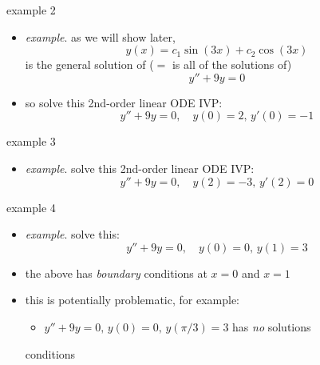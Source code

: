 \documentclass{beamer}
\begin{document}
\begin{frame}{example 2}

\begin{itemize}
\item \emph{example}.  as we will show later,
    $$y(x) = c_1 \sin(3x) + c_2 \cos(3x)$$
is the general solution of ($=$ is all of the solutions of)
    $$y'' + 9 y = 0$$
\item so solve this 2nd-order linear ODE IVP:
    $$y'' + 9y = 0, \quad y(0)=2, \, y'(0)=-1$$
\end{itemize}

\vspace{25mm}
\end{frame}


\begin{frame}{example 3}

\begin{itemize}
\item \emph{example}.  solve this 2nd-order linear ODE IVP:
    $$y'' + 9y = 0, \quad y(2)=-3, \, y'(2)=0$$
\end{itemize}

\vspace{40mm}
\end{frame}


\begin{frame}{example 4}

\begin{itemize}
\item \emph{example}.  solve this:
    $$y'' + 9y = 0, \quad y(0)=0, \, y(1)=3$$

\vspace{40mm}
\item the above has \emph{boundary} conditions at $x=0$ and $x=1$
\item this is potentially problematic, for example:
    \begin{itemize}
    \item $y'' + 9y = 0, \, y(0)=0, \, y(\pi/3)=3$ has \emph{no} solutions
    \end{itemize}
conditions
\end{itemize}
\end{frame}
\end{document}
